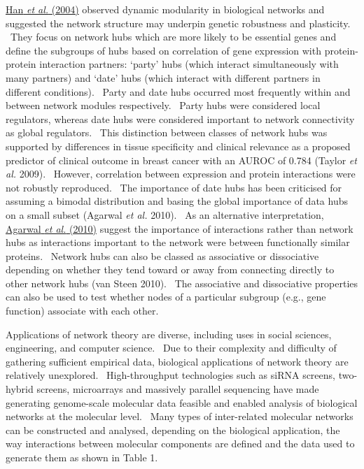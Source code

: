 \hyperlink{ENREF47}{Han}\hyperlink{ENREF47}{\textit{ et al.}}\hyperlink{ENREF47}{ (2004)} observed dynamic modularity in biological networks and suggested the network structure may underpin genetic robustness and plasticity. \ They focus on network hubs which are more likely to be essential genes and define the subgroups of hubs based on correlation of gene expression with protein-protein interaction partners: {\textquoteleft}party{\textquoteright} hubs (which interact simultaneously with many partners) and {\textquoteleft}date{\textquoteright} hubs (which interact with different partners in different conditions). \ Party and date hubs occurred most frequently within and between network modules respectively. \ Party hubs were considered local regulators, whereas date hubs were considered important to network connectivity as global regulators. \ This distinction between classes of network hubs was supported by differences in tissue specificity and clinical relevance as a proposed predictor of clinical outcome in breast cancer with an AUROC of 0.784 (Taylor\textit{ et al.} 2009). \ However, correlation between expression and protein interactions were not robustly reproduced. \ The importance of date hubs has been criticised for assuming a bimodal distribution and basing the global importance of data hubs on a small subset (Agarwal\textit{ et al.} 2010). \ As an alternative interpretation, \hyperlink{ENREF2}{Agarwal}\hyperlink{ENREF2}{\textit{ et al.}}\hyperlink{ENREF2}{ (2010)} suggest the importance of interactions rather than network hubs as interactions important to the network were between functionally similar proteins. \ Network hubs can also be classed as associative or dissociative depending on whether they tend toward or away from connecting directly to other network hubs (van Steen 2010). \ The associative and dissociative properties can also be used to test whether nodes of a particular subgroup (e.g., gene function) associate with each other. \ 

Applications of network theory are diverse, including uses in social sciences, engineering, and computer science. \ Due to their complexity and difficulty of gathering sufficient empirical data, biological applications of network theory are relatively unexplored. \ High-throughput technologies such as siRNA screens, two-hybrid screens, microarrays and massively parallel sequencing have made generating genome-scale molecular data feasible and enabled analysis of biological networks at the molecular level. \ Many types of inter-related molecular networks can be constructed and analysed, depending on the biological application, the way interactions between molecular components are defined and the data used to generate them as shown in Table 1. \ 

